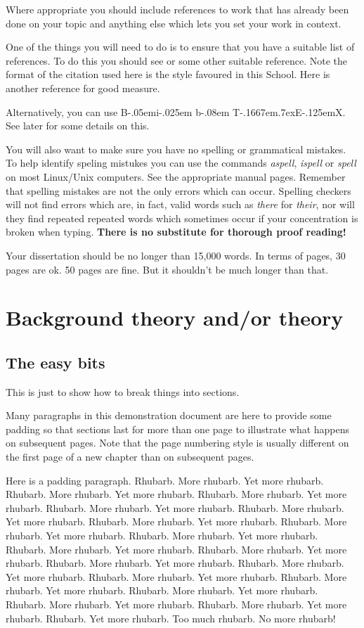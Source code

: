 \documentclass[12pt,a4paper]{report}
\def\BibTeX{{\rm B\kern-.05em{\sc i\kern-.025em b}\kern-.08em
    T\kern-.1667em\lower.7ex\hbox{E}\kern-.125emX}}
\begin{document}
Where appropriate you should include references to work that has
already been done on your topic and anything else which lets you set
your work in context.

One of the things you will need to do is to ensure that you have a
suitable list of references.  To do this you should see \cite{ref:lam}
or some other suitable reference.  Note the format of the citation used
here is the style favoured in this School.  Here is another
reference \cite{ref:bloggs} for good measure.

Alternatively, you can use \BibTeX. See later for some details on this.

You will also want to make sure you have no spelling or grammatical
mistakes. To help identify speling mistukes you can use the commands
\emph{aspell}, \emph{ispell} or \emph{spell} on most Linux/Unix
computers. See the appropriate manual pages. Remember that spelling
mistakes are not the only errors which can occur. Spelling checkers
will not find errors which are, in fact, valid words such as
\emph{there} for {\em their}, nor will they find repeated repeated
words which sometimes occur if your concentration is broken when
typing. \textbf{There is no substitute for thorough proof reading!}

Your dissertation should be no longer than 15,000 words. In terms of
pages, 30 pages are ok. 50 pages are fine. But it shouldn't be
much longer than that.


\chapter{Background theory and/or theory}

\section{The easy bits}
This is just to show how to break things into sections.

Many paragraphs in this demonstration document are here to provide some
padding so that sections last for more than one page to illustrate what
happens on subsequent pages. Note that the page numbering style is usually
different on the first page of a new chapter than on subsequent pages.

Here is a padding paragraph.  Rhubarb.  More rhubarb.  Yet more
rhubarb.  Rhubarb.  More rhubarb.  Yet more rhubarb.  Rhubarb.  More
rhubarb.  Yet more rhubarb.  Rhubarb.  More rhubarb.  Yet more
rhubarb.  Rhubarb.  More rhubarb.  Yet more rhubarb.  Rhubarb.  More
rhubarb.  Yet more rhubarb.  Rhubarb.  More rhubarb.  Yet more
rhubarb.  Rhubarb.  More rhubarb.  Yet more rhubarb.  Rhubarb.  More
rhubarb.  Yet more rhubarb.  Rhubarb. More rhubarb.  Yet more rhubarb.
Rhubarb.  More rhubarb.  Yet more rhubarb.  Rhubarb.  More rhubarb.
Yet more rhubarb. Rhubarb. More rhubarb.  Yet more rhubarb.  Rhubarb.
More rhubarb. Yet more rhubarb.  Rhubarb.  More rhubarb.  Yet more
rhubarb. Rhubarb.  More rhubarb.  Yet more rhubarb.  Rhubarb.  More
rhubarb.  Yet more rhubarb.  Rhubarb. Yet more rhubarb.
Too much rhubarb. No more rhubarb!
\end{document}
